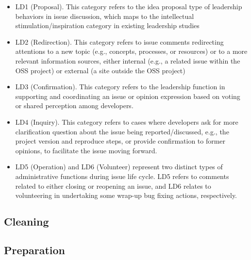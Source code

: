 \begin{itemize}
\item LD1 (Proposal). This category refers to the idea proposal type of leadership behaviors in issue discussion, which maps to the intellectual stimulation/inspiration category in existing leadership studies
\item LD2 (Redirection). This category refers to issue comments redirecting attentions to a new topic (e.g., concepts, processes, or resources) or to a more relevant information sources, either internal (e.g., a related issue within the OSS project) or external (a site outside the OSS project)
\item LD3 (Confirmation). This category refers to the leadership function in supporting and coordinating an issue or opinion expression based on voting or shared perception among developers.
\item LD4 (Inquiry). This category refers to cases where developers ask for more clarification question about the issue being reported/discussed, e.g., the project version and reproduce steps, or provide confirmation to former opinions, to facilitate the issue moving forward.
\item LD5 (Operation) and LD6 (Volunteer) represent two distinct types of administrative functions during issue life cycle. LD5 refers to comments related to either closing or reopening an issue, and LD6 relates to volunteering in undertaking some wrap-up bug fixing actions, respectively.
\end{itemize}

\subsection{Cleaning}


\subsection{Preparation}